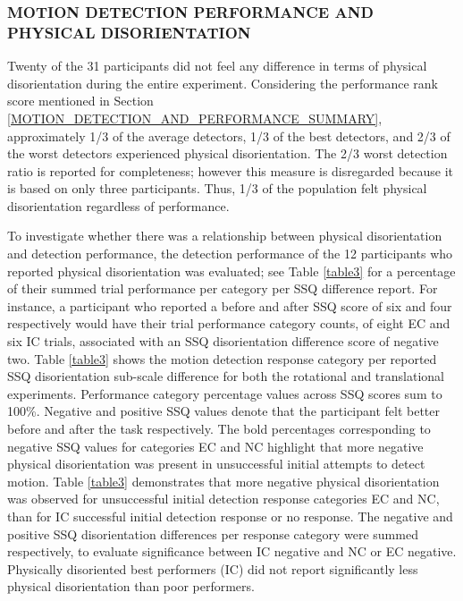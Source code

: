 \documentclass{ieeeaccess}
\begin{document}
\subsubsection{MOTION DETECTION PERFORMANCE AND PHYSICAL DISORIENTATION}
Twenty of the 31 participants did not feel any difference in terms of physical disorientation during the entire experiment. Considering the performance rank score mentioned in Section \ref{MOTION_DETECTION_AND_PERFORMANCE_SUMMARY}, approximately 1/3 of the average detectors, 1/3 of the best detectors, and 2/3 of the worst detectors experienced physical disorientation. The 2/3 worst detection ratio is reported for completeness; however this measure is disregarded because it is based on only three participants. Thus, 1/3 of the population felt physical disorientation regardless of performance.

\indent To investigate whether there was a relationship between physical disorientation and detection performance, the detection performance of the 12 participants who reported physical disorientation was evaluated; see Table \ref{table3} for a percentage of their summed trial performance per category per SSQ difference report. For instance, a participant who reported a before and after SSQ score of six and four respectively would have their trial performance category counts, of eight EC and six IC trials, associated with an SSQ disorientation difference score of negative two. Table \ref{table3} shows the motion detection response category per reported SSQ disorientation sub-scale difference for both the rotational and translational experiments. Performance category percentage values across SSQ scores sum to 100\%. Negative and positive SSQ values denote that the participant felt better before and after the task respectively. The bold percentages corresponding to negative SSQ values for categories EC and NC highlight that more negative physical disorientation was present in unsuccessful initial attempts to detect motion. Table \ref{table3} demonstrates that more negative physical disorientation was observed for unsuccessful initial detection response categories EC and NC, than for IC successful initial detection response or no response. The negative and positive SSQ disorientation differences per response category were summed respectively, to evaluate significance between IC negative and NC or EC negative. Physically disoriented best performers (IC) did not report significantly less physical disorientation than poor performers.
\end{document}
